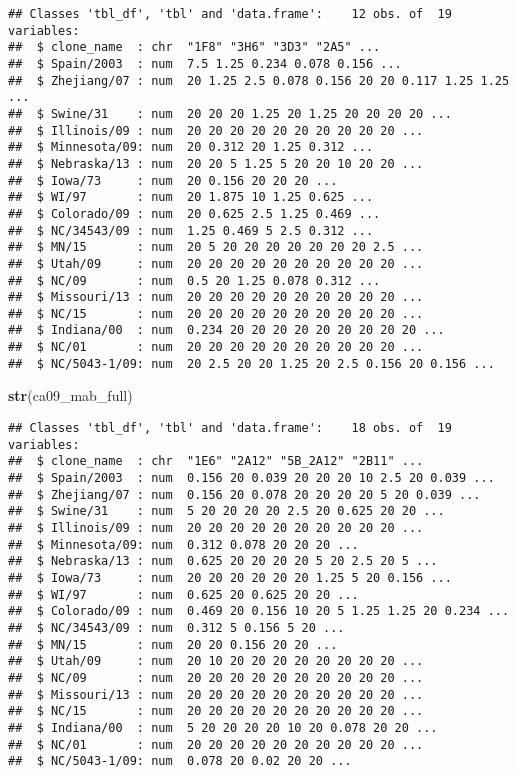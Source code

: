 \documentclass[]{article}
\newenvironment{Shaded}{\begin{snugshade}}{\end{snugshade}}
\newcommand{\KeywordTok}[1]{\textcolor[rgb]{0.13,0.29,0.53}{\textbf{#1}}}
\newcommand{\NormalTok}[1]{#1}
\begin{document}
\begin{verbatim}
## Classes 'tbl_df', 'tbl' and 'data.frame':    12 obs. of  19 variables:
##  $ clone_name  : chr  "1F8" "3H6" "3D3" "2A5" ...
##  $ Spain/2003  : num  7.5 1.25 0.234 0.078 0.156 ...
##  $ Zhejiang/07 : num  20 1.25 2.5 0.078 0.156 20 20 0.117 1.25 1.25 ...
##  $ Swine/31    : num  20 20 20 1.25 20 1.25 20 20 20 20 ...
##  $ Illinois/09 : num  20 20 20 20 20 20 20 20 20 20 ...
##  $ Minnesota/09: num  20 0.312 20 1.25 0.312 ...
##  $ Nebraska/13 : num  20 20 5 1.25 5 20 20 10 20 20 ...
##  $ Iowa/73     : num  20 0.156 20 20 20 ...
##  $ WI/97       : num  20 1.875 10 1.25 0.625 ...
##  $ Colorado/09 : num  20 0.625 2.5 1.25 0.469 ...
##  $ NC/34543/09 : num  1.25 0.469 5 2.5 0.312 ...
##  $ MN/15       : num  20 5 20 20 20 20 20 20 20 2.5 ...
##  $ Utah/09     : num  20 20 20 20 20 20 20 20 20 20 ...
##  $ NC/09       : num  0.5 20 1.25 0.078 0.312 ...
##  $ Missouri/13 : num  20 20 20 20 20 20 20 20 20 20 ...
##  $ NC/15       : num  20 20 20 20 20 20 20 20 20 20 ...
##  $ Indiana/00  : num  0.234 20 20 20 20 20 20 20 20 20 ...
##  $ NC/01       : num  20 20 20 20 20 20 20 20 20 20 ...
##  $ NC/5043-1/09: num  20 2.5 20 20 1.25 20 2.5 0.156 20 0.156 ...
\end{verbatim}

\begin{Shaded}
\begin{Highlighting}[]
\KeywordTok{str}\NormalTok{(ca09_mab_full)}
\end{Highlighting}
\end{Shaded}

\begin{verbatim}
## Classes 'tbl_df', 'tbl' and 'data.frame':    18 obs. of  19 variables:
##  $ clone_name  : chr  "1E6" "2A12" "5B_2A12" "2B11" ...
##  $ Spain/2003  : num  0.156 20 0.039 20 20 20 10 2.5 20 0.039 ...
##  $ Zhejiang/07 : num  0.156 20 0.078 20 20 20 20 5 20 0.039 ...
##  $ Swine/31    : num  5 20 20 20 20 2.5 20 0.625 20 20 ...
##  $ Illinois/09 : num  20 20 20 20 20 20 20 20 20 20 ...
##  $ Minnesota/09: num  0.312 0.078 20 20 20 ...
##  $ Nebraska/13 : num  0.625 20 20 20 20 5 20 2.5 20 5 ...
##  $ Iowa/73     : num  20 20 20 20 20 20 1.25 5 20 0.156 ...
##  $ WI/97       : num  0.625 20 0.625 20 20 ...
##  $ Colorado/09 : num  0.469 20 0.156 10 20 5 1.25 1.25 20 0.234 ...
##  $ NC/34543/09 : num  0.312 5 0.156 5 20 ...
##  $ MN/15       : num  20 20 0.156 20 20 ...
##  $ Utah/09     : num  20 10 20 20 20 20 20 20 20 20 ...
##  $ NC/09       : num  20 20 20 20 20 20 20 20 20 20 ...
##  $ Missouri/13 : num  20 20 20 20 20 20 20 20 20 20 ...
##  $ NC/15       : num  20 20 20 20 20 20 20 20 20 20 ...
##  $ Indiana/00  : num  5 20 20 20 20 10 20 0.078 20 20 ...
##  $ NC/01       : num  20 20 20 20 20 20 20 20 20 20 ...
##  $ NC/5043-1/09: num  0.078 20 0.02 20 20 ...
\end{verbatim}
\end{document}
